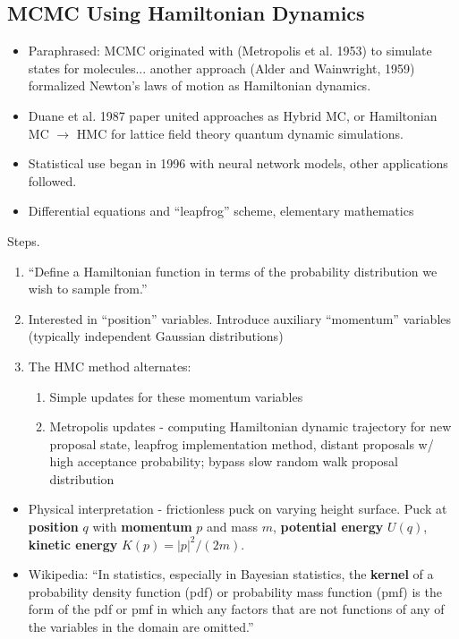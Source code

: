 \documentclass{article}
\begin{document}
\subsection*{MCMC Using Hamiltonian Dynamics \citep{Neal2011}}
\begin{itemize}
\item Paraphrased: MCMC originated with (Metropolis et al. 1953) to simulate states for molecules... another approach (Alder and Wainwright, 1959) formalized Newton’s laws of motion as Hamiltonian dynamics.
\item Duane et al. 1987 paper united approaches as Hybrid MC, or Hamiltonian MC $\rightarrow$ HMC for lattice field theory quantum dynamic simulations. 
\item Statistical use began in 1996 with neural network models, other applications followed.
\item Differential equations and ``leapfrog'' scheme, elementary mathematics

\end{itemize}
Steps.
      \begin{enumerate}
      \item ``Define a Hamiltonian function in terms of the probability distribution we wish to sample from.''
      \item Interested in ``position'' variables. Introduce auxiliary ``momentum'' variables (typically independent Gaussian distributions)
      \item The HMC method alternates:
        \begin{enumerate}
        \item Simple updates for these momentum variables 
        \item Metropolis updates - computing Hamiltonian dynamic trajectory for new proposal state, leapfrog implementation method, distant proposals w/ high acceptance probability; bypass slow random walk proposal distribution
        \end{enumerate}
      \end{enumerate}
\begin{itemize}
\item Physical interpretation - frictionless puck on varying height surface. Puck at {\bf position} $q$ with {\bf momentum} $p$ and mass $m$, {\bf potential energy} $U(q)$, {\bf kinetic energy} $K(p) = |p|^{2}/(2m)$.
\item Wikipedia: ``In statistics, especially in Bayesian statistics, the {\bf kernel} of a probability density function (pdf) or probability mass function (pmf) is the form of the pdf or pmf in which any factors that are not functions of any of the variables in the domain are omitted.''
\end{itemize}
\end{document}
